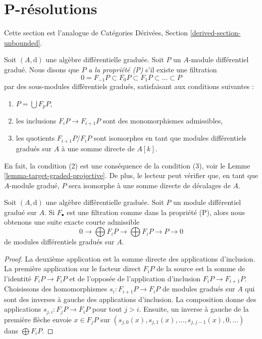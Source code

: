 \section{P-résolutions}
\label{section-P-resolutions}

\noindent
Cette section est l'analogue de Catégories Dérivées, Section
\ref{derived-section-unbounded}.

\medskip\noindent
Soit $(A, \text{d})$ une algèbre différentielle graduée. Soit $P$ un $A$-module
différentiel gradué. Nous disons que $P$ {\it a la propriété (P)} s'il existe une
filtration
$$
0 = F_{-1}P \subset F_0P \subset F_1P \subset \ldots \subset P
$$
par des sous-modules différentiels gradués, satisfaisant aux conditions suivantes :
\begin{enumerate}
\item $P = \bigcup F_pP$,
\item les inclusions $F_iP \to F_{i + 1}P$ sont des monomorphismes admissibles,
\item les quotients $F_{i + 1}P/F_iP$ sont isomorphes en tant que modules
différentiels gradués sur $A$ à une somme directe de $A[k]$.
\end{enumerate}
En fait, la condition (2) est une conséquence de la condition (3), voir le Lemme
\ref{lemma-target-graded-projective}. De plus, le lecteur peut vérifier que, en
tant que $A$-module gradué, $P$ sera isomorphe à une somme directe de décalages de
$A$.

\begin{lemma}
\label{lemma-property-P-sequence}
Soit $(A, \text{d})$ une algèbre différentielle graduée. Soit $P$ un module
différentiel gradué sur $A$. Si $F_\bullet$ est une filtration comme dans la propriété
(P), alors nous obtenons une suite exacte courte admissible
$$
0 \to
\bigoplus\nolimits F_iP \to
\bigoplus\nolimits F_iP \to P \to 0
$$
de modules différentiels gradués sur $A$.
\end{lemma}

\begin{proof}
La deuxième application est la somme directe des applications d'inclusion. La
première application sur le facteur direct $F_iP$ de la source est la somme de l'identité
$F_iP \to F_iP$ et de l'opposée de l'application d'inclusion $F_iP \to F_{i +
1}P$. Choisissons des homomorphismes $s_i : F_{i + 1}P \to F_iP$ de modules gradués
sur $A$ qui sont des inverses à gauche des applications d'inclusion. La composition
donne des applications $s_{j, i} : F_jP \to F_iP$ pour tout $j > i$. Ensuite, un
inverse à gauche de la première flèche envoie $x \in F_jP$ sur $(s_{j, 0}(x),
s_{j, 1}(x), \ldots, s_{j, j - 1}(x), 0, \ldots)$ dans $\bigoplus F_iP$.
\end{proof}

